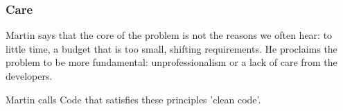 \subsubsection{Care}
Martin says that the core of the problem is not the reasons we often hear: to little time, a budget that is too small, shifting requirements. He proclaims the problem to be more fundamental: unprofessionalism or a lack of care from the developers.

\newblock

Martin calls Code that satisfies these principles 'clean code'.
